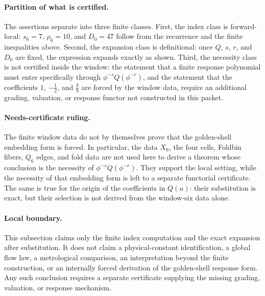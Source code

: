 \paragraph{Partition of what is certified.}
The assertions separate into three finite classes. First, the index class is forward-local: $s_6=7$, $\rho_6=10$, and $D_0=47$ follow from the recurrence and the finite inequalities above. Second, the expansion class is definitional: once $Q$, $s$, $r$, and $D_0$ are fixed, the expression expands exactly as shown. Third, the necessity class is not certified inside the window: the statement that a finite response polynomial must enter specifically through $\phi^{-s}Q(\phi^{-r})$, and the statement that the coefficients $1$, $-\frac{1}{2}$, and $\frac{8}{9}$ are forced by the window data, require an additional grading, valuation, or response functor not constructed in this packet.

\paragraph{Needs-certificate ruling.}
The finite window data do not by themselves prove that the golden-shell embedding form is forced. In particular, the data $X_6$, the four cells, Foldbin fibers, $Q_6$ edges, and fold data are not used here to derive a theorem whose conclusion is the necessity of $\phi^{-s}Q(\phi^{-r})$. They support the local setting, while the necessity of that embedding form is left to a separate functorial certificate. The same is true for the origin of the coefficients in $Q(u)$: their substitution is exact, but their selection is not derived from the window-six data alone.

\paragraph{Local boundary.}
This subsection claims only the finite index computation and the exact expansion after substitution. It does not claim a physical-constant identification, a global flow law, a metrological comparison, an interpretation beyond the finite construction, or an internally forced derivation of the golden-shell response form. Any such conclusion requires a separate certificate supplying the missing grading, valuation, or response mechanism.

